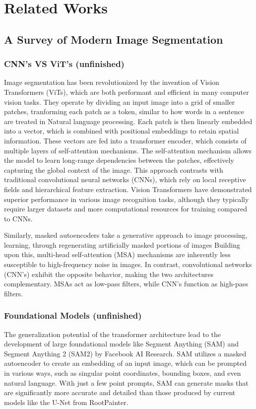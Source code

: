 \chapter{Related Works}
\section{A Survey of Modern Image Segmentation}
\subsection{CNN's VS ViT's (unfinished)}

Image segmentation has been revolutionized by the invention of Vision Transformers (ViTs)\cite{dosovitskiy2020image}, which are both performant and efficient in many computer vision tasks. They operate by dividing an input image into a grid of smaller patches, tranforming each patch as a token, similar to how words in a sentence are treated in Natural language processing. Each patch is then linearly embedded into a vector, which is combined with positional embeddings to retain spatial information. These vectors are fed into a transformer encoder, which consists of multiple layers of self-attention mechanisms. The self-attention mechanism allows the model to learn long-range dependencies between the patches, effectively capturing the global context of the image. This approach contrasts with traditional convolutional neural networks (CNNs), which rely on local receptive fields and hierarchical feature extraction. Vision Transformers have demonstrated superior performance in various image recognition tasks, although they typically require larger datasets and more computational resources for training compared to CNNs. \cite{Park22} 

Similarly, masked autoencoders take a generative approach to image processing, learning, through regenerating artificially masked portions of images\cite{he2022masked} Building upon this, multi-head self-attention (MSA) mechanisms are inherently less susceptible to high-frequency noise in images. In contrast, convolutional networks (CNN's) exhibit the opposite behavior, making the two architectures complementary. MSAs act as low-pass filters, while CNN's function as high-pass filters.\cite{AlterNet}

\subsection{Foundational Models (unfinished)}
 The generalization potential of the transformer architecture lead to the development of large foundational models like Segment Anything (SAM) and Segment Anything 2 (SAM2) by Facebook AI Research. SAM utilizes a masked autoencoder to create an embedding of an input image, which can be prompted in various ways, such as singular point coordinates, bounding boxes, and even natural language.\cite{Kirillov2023-ok}  With just a few point prompts, SAM can generate masks that are significantly more accurate and detailed than those produced by current models like the U-Net from RootPainter.

